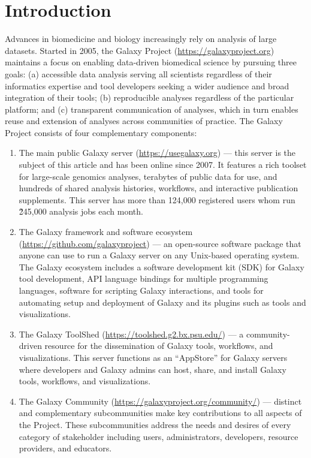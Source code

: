 \section*{Introduction}
Advances in biomedicine and biology increasingly rely on analysis of large datasets. Started in 2005, the Galaxy Project (\url{https://galaxyproject.org})~\cite{giardine2005galaxy,blankenberg2007framework,afgan2016galaxy} maintains a focus on enabling data-driven biomedical science by pursuing three goals: (a) accessible data analysis serving all scientists regardless of their informatics expertise and tool developers seeking a wider audience and broad integration of their tools; (b) reproducible analyses regardless of the particular platform; and (c) transparent communication of analyses, which in turn enables reuse and extension of analyses across communities of practice. The Galaxy Project consists of four complementary components:

\begin{enumerate}
\item The main public Galaxy server (\url{https://usegalaxy.org}) — this server is the subject of this article and has been online since 2007. It features a rich toolset for large-scale genomics analyses, terabytes of public data for use, and hundreds of shared analysis histories, workflows, and interactive publication supplements. This server has more than 124,000 registered users whom run \~245,000 analysis jobs each month.

\item The Galaxy framework and software ecosystem (\url{https://github.com/galaxyproject}) — an open-source software package that anyone can use to run a Galaxy server on any Unix-based operating system. The Galaxy ecosystem includes a software development kit (SDK) for Galaxy tool development, API language bindings for multiple programming languages, software for scripting Galaxy interactions, and tools for automating setup and deployment of Galaxy and its plugins such as tools and visualizations.

\item The Galaxy ToolShed (\url{https://toolshed.g2.bx.psu.edu/}) — a community-driven resource for the dissemination of Galaxy tools, workflows, and visualizations. This server functions as an “AppStore” for Galaxy servers where developers and Galaxy admins can host, share, and install Galaxy tools, workflows, and visualizations.

\item The Galaxy Community (\url{https://galaxyproject.org/community/}) — distinct and complementary subcommunities make key contributions to all aspects of the Project. These subcommunities address the needs and desires of every category of stakeholder including users, administrators, developers, resource providers, and educators.
\end{enumerate}

